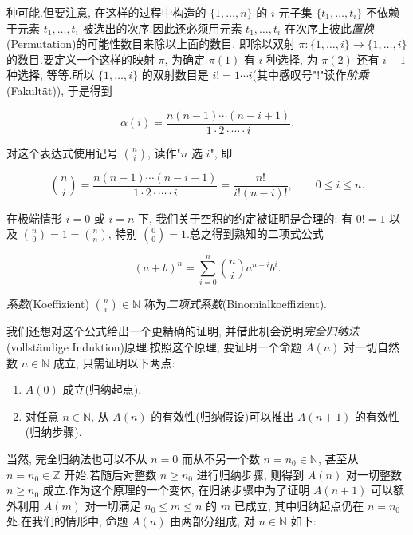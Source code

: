 种可能.但要注意, 在这样的过程中构造的 $\{1, \ldots, n\}$ 的 $i$ 元子集 $\{t_1, \ldots, t_i\}$ 不依赖于元素 $t_1, \ldots, t_i$ 被选出的次序.因此还必须用元素 $t_1, \ldots, t_i$ 在次序上彼此\emph{置换}(\textup{Permutation})的可能性数目来除以上面的数目, 即除以双射 $\pi \colon \{1, \ldots, i\} \longrightarrow \{1, \ldots, i\}$ 的数目.要定义一个这样的映射 $\pi$, 为确定 $\pi(1)$ 有 $i$ 种选择, 为 $\pi(2)$ 还有 $i - 1$ 种选择, 等等.所以 $\{1, \ldots, i\}$ 的双射数目是 $i! = 1 \cdots i$(其中感叹号"!"读作\emph{阶乘}(\textup{Fakultät})), 于是得到

\[
\alpha(i) = \frac{n(n - 1) \cdots (n - i + 1)}{1 \cdot 2 \cdot \cdots \cdot i}\text{.}
\]

对这个表达式使用记号 $\binom{n}{i}$, 读作"$n$ 选 $i$", 即

\[
\binom{n}{i} = \frac{n(n - 1) \cdots (n - i + 1)}{1 \cdot 2 \cdot \cdots \cdot i} = \frac{n!}{i!(n - i)!}, \qquad 0 \leq i \leq n\text{.}
\]

在极端情形 $i = 0$ 或 $i = n$ 下, 我们关于空积的约定被证明是合理的: 有 $0! = 1$ 以及 $\binom{n}{0} = 1 = \binom{n}{n}$, 特别 $\binom{0}{0} = 1$.总之得到熟知的二项式公式

\[
(a + b)^n = \sum_{i = 0}^{n} \binom{n}{i} a^{n - i} b^{i}\text{.}
\]

\emph{系数}(\textup{Koeffizient}) $\binom{n}{i} \in \mathbb{N}$ 称为\emph{二项式系数}(\textup{Binomialkoeffizient}).

我们还想对这个公式给出一个更精确的证明, 并借此机会说明\emph{完全归纳法}(\textup{vollständige Induktion})原理.按照这个原理, 要证明一个命题 $A(n)$ 对一切自然数 $n \in \mathbb{N}$ 成立, 只需证明以下两点:
\begin{enumerate}
\item[(1)] $A(0)$ 成立(归纳起点).
\item[(2)] 对任意 $n \in \mathbb{N}$, 从 $A(n)$ 的有效性(归纳假设)可以推出 $A(n + 1)$ 的有效性(归纳步骤).
\end{enumerate}

当然, 完全归纳法也可以不从 $n = 0$ 而从不另一个数 $n = n_0 \in \mathbb{N}$, 甚至从 $n = n_0 \in \mathbb{Z}$ 开始.若随后对整数 $n \geq n_0$ 进行归纳步骤, 则得到 $A(n)$ 对一切整数 $n \geq n_0$ 成立.作为这个原理的一个变体, 在归纳步骤中为了证明 $A(n + 1)$ 可以额外利用 $A(m)$ 对一切满足 $n_0 \leq m \leq n$ 的 $m$ 已成立, 其中归纳起点仍在 $n = n_0$ 处.在我们的情形中, 命题 $A(n)$ 由两部分组成, 对 $n \in \mathbb{N}$ 如下:

